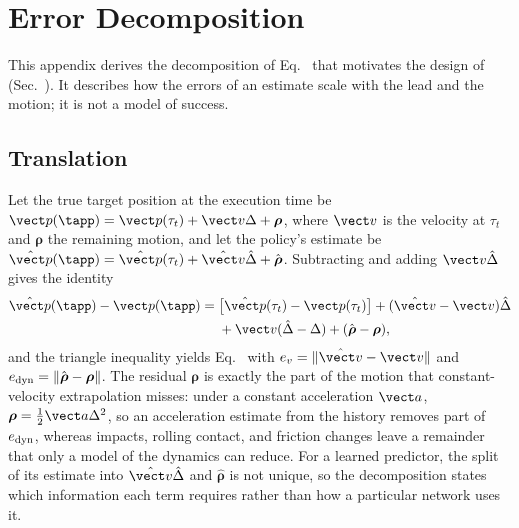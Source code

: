 \section{Error Decomposition}
\label{app:analysis}

This appendix derives the decomposition of Eq.~ that motivates
the design of \ours (Sec.~). It describes how the errors of
an estimate scale with the lead and the motion; it is not a model of success.

\subsection{Translation}
\label{app:budget_translation}
Let the true target position at the execution time be
$\vect p(\tapp)=\vect p(\tau_t)+\vect v\Delta+\boldsymbol\rho$, where $\vect v$ is
the velocity at $\tau_t$ and $\boldsymbol\rho$ the remaining motion, and let the
policy's estimate be
$\hat{\vect p}(\tapp)=\hat{\vect p}(\tau_t)+\hat{\vect v}\hat\Delta+\hat{\boldsymbol\rho}$.
Subtracting and adding $\vect v\hat\Delta$ gives the identity
\begin{equation}
\begin{aligned}
\hat{\vect p}(\tapp)-\vect p(\tapp)
={}&\big[\hat{\vect p}(\tau_t)-\vect p(\tau_t)\big]+(\hat{\vect v}-\vect v)\hat\Delta\\
&+\vect v(\hat\Delta-\Delta)+(\hat{\boldsymbol\rho}-\boldsymbol\rho),
\end{aligned}
\label{eq:budget_identity}
\end{equation}
and the triangle inequality yields Eq.~ with
$e_v=\|\hat{\vect v}-\vect v\|$ and $e_{\rm dyn}=\|\hat{\boldsymbol\rho}-\boldsymbol\rho\|$.
The residual $\boldsymbol\rho$ is exactly the part of the motion that
constant-velocity extrapolation misses: under a constant acceleration $\vect a$,
$\boldsymbol\rho=\tfrac12\vect a\Delta^2$, so an acceleration estimate from the
history removes part of $e_{\rm dyn}$, whereas impacts, rolling contact, and friction
changes leave a remainder that only a model of the dynamics can reduce. For a
learned predictor, the split of its estimate into $\hat{\vect v}\hat\Delta$ and
$\hat{\boldsymbol\rho}$ is not unique, so the decomposition states which information
each term requires rather than how a particular network uses it.

